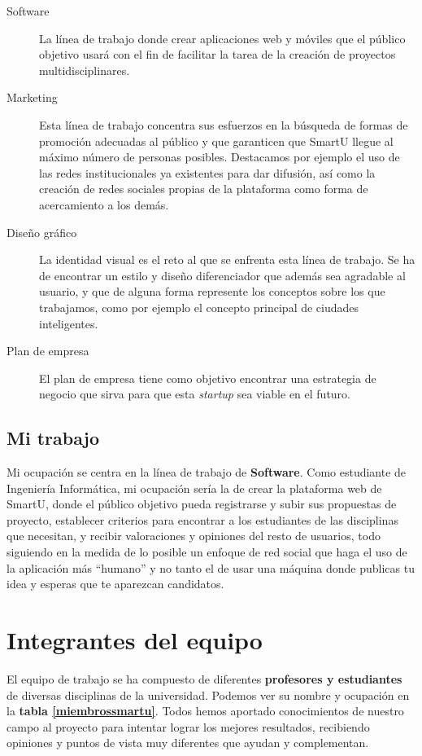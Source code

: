 \begin{description}
    \item[Software] La línea de trabajo donde crear aplicaciones web y móviles que el público objetivo usará con el fin de facilitar la tarea de la creación de proyectos multidisciplinares.
    \item[Marketing] Esta línea de trabajo concentra sus esfuerzos en la búsqueda de formas de promoción adecuadas al público y que garanticen que SmartU llegue al máximo número de personas posibles. Destacamos por ejemplo el uso de las redes institucionales ya existentes para dar difusión, así como la creación de redes sociales propias de la plataforma como forma de acercamiento a los demás.
    \item[Diseño gráfico] La identidad visual es el reto al que se enfrenta esta línea de trabajo. Se ha de encontrar un estilo y diseño diferenciador que además sea agradable al usuario, y que de alguna forma represente los conceptos sobre los que trabajamos, como por ejemplo el concepto principal de ciudades inteligentes.
    \item[Plan de empresa] El plan de empresa tiene como objetivo encontrar una estrategia de negocio que sirva para que esta \textit{startup} sea viable en el futuro.
\end{description}

\subsection{Mi trabajo}
Mi ocupación se centra en la línea de trabajo de \textbf{Software}. Como estudiante de Ingeniería Informática, mi ocupación sería la de crear la plataforma web de SmartU, donde el público objetivo pueda registrarse y subir sus propuestas de proyecto, establecer criterios para encontrar a los estudiantes de las disciplinas que necesitan, y recibir valoraciones y opiniones del resto de usuarios, todo siguiendo en la medida de lo posible un enfoque de red social que haga el uso de la aplicación más ``humano'' y no tanto el de usar una máquina donde publicas tu idea y esperas que te aparezcan candidatos.

\section{Integrantes del equipo}
El equipo de trabajo se ha compuesto de diferentes \textbf{profesores y estudiantes} de diversas disciplinas de la universidad. Podemos ver su nombre y ocupación en la \textbf{tabla \ref{miembrossmartu}}. Todos hemos aportado conocimientos de nuestro campo al proyecto para intentar lograr los mejores resultados, recibiendo opiniones y puntos de vista muy diferentes que ayudan y complementan.\\

